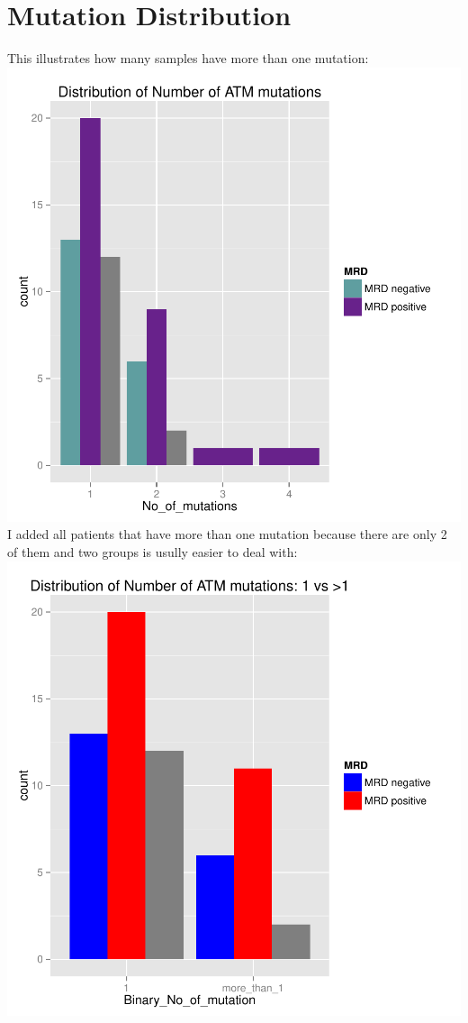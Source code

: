 \documentclass[a4paper,11pt]{article}
\begin{document}
\section*{Mutation Distribution}
This illustrates how many samples have more than one mutation:\\
\includegraphics{ATM_VAF-002}
\\I added all patients that have more than one mutation because there are only 2 of them and two groups is usully easier to deal with:\\
\includegraphics{ATM_VAF-003}
\end{document}
